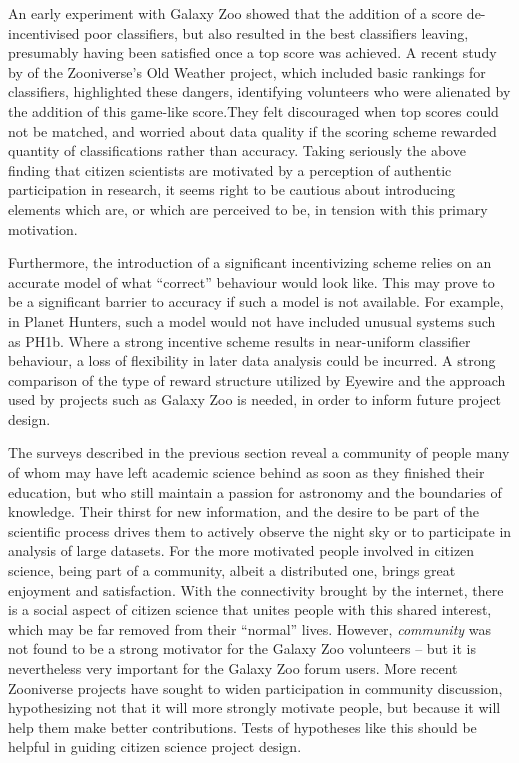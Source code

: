 \documentclass{ar2e}
\begin{document}
An early experiment with Galaxy Zoo showed that the addition of a score
de-incentivised poor classifiers, but also resulted in the best classifiers
leaving, presumably having been satisfied once a top score was achieved. A
recent study by \citep{Eveleigh++2013} of the Zooniverse's Old Weather
project, which included basic rankings for classifiers, highlighted these
dangers, identifying volunteers who were alienated by the addition of this
game-like score.They felt discouraged when top scores could not be matched, and
worried about data quality if the scoring scheme rewarded quantity of
classifications rather than accuracy. Taking seriously the above finding  that
citizen scientists are motivated by a perception of authentic participation in
research, it seems right to be cautious about introducing elements which are, or
which are perceived to be, in tension with this primary motivation. 

Furthermore, the introduction of a significant incentivizing scheme relies on an
accurate model of what ``correct'' behaviour would look like. This may prove to
be a significant barrier to accuracy if such a model is not available. For
example, in Planet Hunters, such a model would not have included unusual systems
such as PH1b. Where a strong incentive scheme results in near-uniform classifier
behaviour, a loss of flexibility in later data analysis could be incurred.  A
strong comparison of the type of reward structure utilized by Eyewire and the
approach used by projects such as Galaxy Zoo is needed, in order to inform
future project design. 

The surveys described in the previous section reveal a community of people many
of whom may have left academic science behind as soon as they finished their 
education, but who still maintain a passion for astronomy and the boundaries of
knowledge.  Their thirst for new information, and the  desire to be part of the 
scientific process drives them to actively observe the  night sky or to
participate in analysis of large datasets.  For the more motivated people
involved in citizen science, being part of a community,  albeit a distributed
one, brings great enjoyment and satisfaction.  With the connectivity brought by
the internet, there is a social  aspect of citizen science that unites people
with this shared interest, which may be far removed from their ``normal'' 
lives. However, {\it community} was not found to be a strong motivator for the
Galaxy Zoo volunteers -- but it is nevertheless very important for the Galaxy
Zoo forum users. More recent Zooniverse projects have sought to widen
participation in community discussion, hypothesizing not that it will more
strongly motivate people, but because it will help them make better
contributions. Tests of hypotheses like this should be helpful in guiding
citizen science project design.
\end{document}
